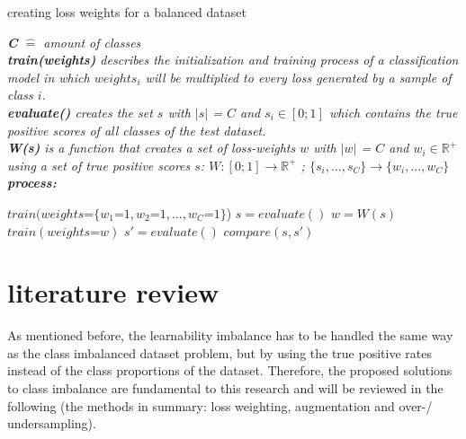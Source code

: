 \documentclass[journal]{IEEEtran}
\begin{document}
\begin{algorithm}[H]
        \caption{creating loss weights for a balanced dataset}

        \textit{\textbf{C} $\hat{=}$ amount of classes}
        \\ \textit{\textbf{train(weights)} describes the initialization and training process of a classification model in which $weights_i$ will be multiplied to every loss generated by a sample of class $i$.}
        \\ \textit{\textbf{evaluate()} creates the set $s$ with $\left|s\right|$ = $C$ and $s_i \in [0;1]$ which contains the true positive scores of all classes of the test dataset.}
        \\ \textit{\textbf{W(s)} is a function that creates a set of loss-weights $w$ with $\left|w\right|$ = $C$ and $w_i \in \mathbb{R}^{+}$ using a set of true positive scores $s$: $W: [0;1] \rightarrow \mathbb{R}^{+}$ ; $\{s_i,...,s_C\} \rightarrow \{w_i,...,w_C\}$ }
        \\ \textit{\textbf{process:}}
        \begin{algorithmic}[1]
         \STATE $train(weights\texttt{=}\{w_1\texttt{=}1, w_2\texttt{=}1, ..., w_C\texttt{=}1\}$)
         \STATE $s = evaluate()$
         \STATE $w = W(s)$
         \STATE $train(weights\texttt{=}w)$
         \STATE $s' = evaluate()$
         \STATE $compare(s, s')$

        \end{algorithmic}
\end{algorithm}


\section{literature review}
As mentioned before, the learnability imbalance has to be handled the same way as the class imbalanced dataset problem, but by using the true positive rates instead of the class proportions of the dataset.
Therefore, the proposed solutions to class imbalance are fundamental to this research and will be reviewed in the following (the methods in summary: loss weighting, augmentation and over-/ undersampling).
\end{document}

